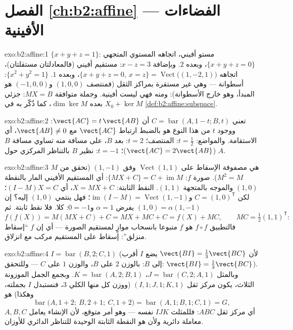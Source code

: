 \section*{الفصل \ref{ch:b2:affine} --- الفضاءات الأفينية}

\begin{solution}{exo:b2:affine:1}
$\{x + y + z = 1\}$: مستو أفيني، اتجاهه المستوي المتجهي $\{x
+ y + z = 0\}$، وبعده $2$. وبإضافة
$x - z = 3$: مستقيم أفيني (فالمعادلتان مستقلتان)، اتجاهه $\{x + y + z = 0,\ x = z\}
= \operatorname{Vect}\bigl((1, -2, 1)\bigr)$، وبعده $1$.
$\{x^2
+ y^2 = 1\}$: أسطوانة --- وهي غير مستقرة بمراكز الثقل (فمنتصف $(1,0,0)$ و$(-1,0,0)$
هو المبدأ، وهو خارج الأسطوانة): ومنه فهي ليست أفينية. وجملة متوافقة
$MX = B$:  جزئي $X_0 + \ker M$ بعده $\dim\ker M$، كما ذُكّر به في
\cref{def:b2:affine:subspace}.
\end{solution}

\begin{solution}{exo:b2:affine:2}
تعني $C = \operatorname{bar}(A, 1-t; B, t)$ أن $\vect{AC} =
t\,\vect{AB}$: ووجود $t$ من هذا النوع هو بالضبط ارتباط
$\vect{AC}$ مع $\vect{AB} \neq 0$، أي الاستقامة. والمواضع: $t
= \frac12$: المنتصف؛ $t = 2$: بعد
$B$، على مسافة منه تساوي مسافة $B$ ($\vect{AC} = 2\vect{AB}$)؛ $t = -1$: نظير $B$
بالتناظر المركزي حول $A$.
\end{solution}

\begin{solution}{exo:b2:affine:3}
$M$ هي مصفوفة الإسقاط على $\operatorname{Vect}(1,1)$ وفق $(1,-1)$ (تحقق من $M^2 = M$). صورة
$f$: $\{MX + C\} = C +
\operatorname{im} M$: أي المستقيم الأفيني المار بالنقطة $(1,0)$ والموجه
بالمتجهة $(1,1)$. النقط الثابتة: $X = MX + C$، أي $(I - M)X = C$؛ لكن $C =
(1, 0)^{\mathsf T}$ و$\operatorname{im}(I - M) =
\operatorname{Vect}(1,-1)$؛
فهل ينتمي $(1,0)$ إليه؟ إن $(1, 0) =
\alpha(1,-1)$ يفرض $\alpha = 1$ و$0 = -1$: كلا. فلا نقط
ثابتة. ثم
\[
f(f(X)) = M(MX + C) + C = MX + MC + C = f(X) + MC,
\qquad MC = \tfrac12(1,1)^{\mathsf T} :
\]
فالتطبيق $f\circ f$ هو $f$ متبوعا بانسحاب موازٍ لمستقيم الصورة ---
أي إن $f$ ``إسقاط منزلق'': إسقاط على المستقيم مركب مع انزلاق.
\end{solution}

\begin{solution}{exo:b2:affine:4}
$I = \operatorname{bar}(B, 2; C, 1)$ (لأن $\vect{BI} =
\frac13\vect{BC}$ يضع $I$ أقرب إلى $B$: بالوزن $2$ على
$B$، والوزن $1$ على $C$ --- وللتحقق: $\vect{BI} = \frac{1}{3}\vect{BC}$).
وبالمثل $J = \operatorname{bar}(C, 2; A, 1)$، $K =
\operatorname{bar}(A, 2; B, 1)$. وبجمع الجمل الموزونة الثلاث، يكون مركز ثقل
$(I, 1; J, 1; K, 1)$ (ووزن كل منها الكلي $3$، فنستبدل $I$ بجملته، وهكذا) هو
\[
\operatorname{bar}\bigl(A, 1 + 2;\ B, 2 + 1;\ C, 1 + 2\bigr)
= \operatorname{bar}(A, 1; B, 1; C, 1) = G ,
\]
أي مركز ثقل $ABC$: فللمثلث $IJK$  نفسه --- وهو أمر متوقع،
لأن الإنشاء يعامل $A, B, C$ معاملة دائرية ولأن  هو النقطة
الثابتة الوحيدة للتناظر الدائري للأوزان.
\end{solution}


